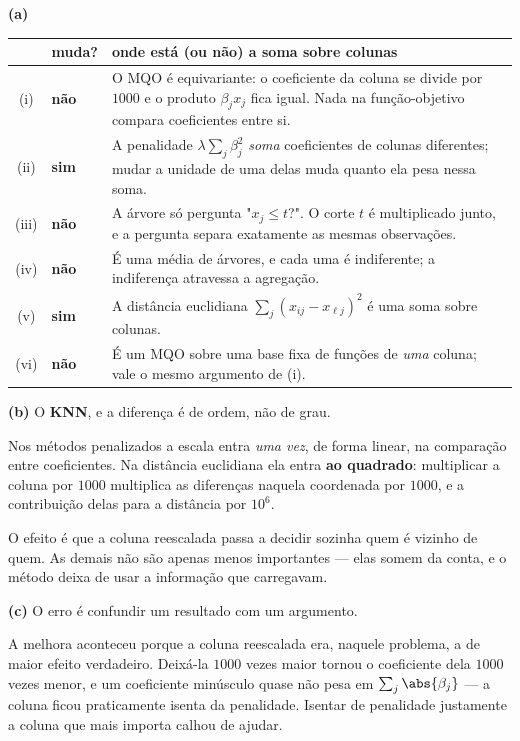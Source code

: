 \begin{solucao}
\textbf{(a)}

\begin{center}\small
\renewcommand{\arraystretch}{1.25}
\begin{tabular}{@{}clp{8.2cm}@{}}
\toprule
 & muda? & onde está (ou não) a soma sobre colunas \\
\midrule
(i) & \textbf{não} & O MQO é equivariante: o coeficiente da coluna se divide por
$1000$ e o produto $\beta_jx_j$ fica igual. Nada na função-objetivo compara
coeficientes entre si. \\
(ii) & \textbf{sim} & A penalidade $\lambda\sum_j\beta_j^2$ \emph{soma}
coeficientes de colunas diferentes; mudar a unidade de uma delas muda quanto ela
pesa nessa soma. \\
(iii) & \textbf{não} & A árvore só pergunta "$x_j\le t$?". O corte $t$ é
multiplicado junto, e a pergunta separa exatamente as mesmas observações. \\
(iv) & \textbf{não} & É uma média de árvores, e cada uma é indiferente; a
indiferença atravessa a agregação. \\
(v) & \textbf{sim} & A distância euclidiana $\sum_j(x_{ij}-x_{\ell j})^2$ é uma
soma sobre colunas. \\
(vi) & \textbf{não} & É um MQO sobre uma base fixa de funções de \emph{uma}
coluna; vale o mesmo argumento de (i). \\
\bottomrule
\end{tabular}
\end{center}

\smallskip
\textbf{(b)} O \textbf{KNN}, e a diferença é de ordem, não de grau.

Nos métodos penalizados a escala entra \emph{uma vez}, de forma linear, na
comparação entre coeficientes. Na distância euclidiana ela entra \textbf{ao
quadrado}: multiplicar a coluna por $1000$ multiplica as diferenças naquela
coordenada por $1000$, e a contribuição delas para a distância por $10^6$.

O efeito é que a coluna reescalada passa a decidir sozinha quem é vizinho de quem.
As demais não são apenas menos importantes --- elas somem da conta, e o método
deixa de usar a informação que carregavam.

\smallskip
\textbf{(c)} O erro é confundir um resultado com um argumento.

A melhora aconteceu porque a coluna reescalada era, naquele problema, a de maior
efeito verdadeiro. Deixá-la $1000$ vezes maior tornou o coeficiente dela $1000$
vezes menor, e um coeficiente minúsculo quase não pesa em $\sum_j\abs{\beta_j}$ ---
a coluna ficou praticamente isenta da penalidade. Isentar de penalidade justamente
a coluna que mais importa calhou de ajudar.


\end{solucao}

